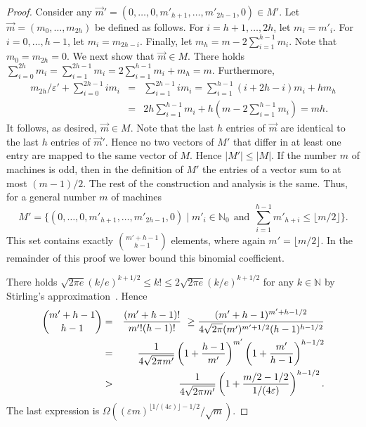 \documentclass{llncs}
\newcommand{\eps}{\varepsilon}
\begin{document}
\begin{proof}
Consider any $\vec{m}' = (0,\ldots, 0,m'_{h+1}, \ldots, m'_{2h-1},0) \in M'$. Let $\vec{m} = (m_0, \ldots, m_{2h})$
be defined as follows. For $i= h+1, \ldots, 2h$, let $m_i = m'_i$. For $i=0, \ldots, h-1$, let $m_i = m_{2h-i}$.
Finally, let $m_h = m -2\sum_{i=1}^{h-1} m_i$. Note that $m_0=m_{2h} =0$. We next show that $\vec{m}\in M$. 
There holds $\sum_{i=0}^{2h} m_i = \sum_{i=1}^{2h-1} m_i = 2\sum_{i=1}^{h-1} m_i +m_h = m$. Furthermore,
\begin{eqnarray*}
m_{2h}/\eps' + \sum_{i=0}^{2h-1} im_i & = & \sum_{i=1}^{2h-1} im_i = \sum_{i=1}^{h-1} (i+2h-i) m_i +hm_h \\
& = & 2h\sum_{i=1}^{h-1}m_i + h(m-2\sum_{i=1}^{h-1} m_i) = mh.
\end{eqnarray*}
It follows, as desired, $\vec{m}\in M$. Note that the last $h$ entries of $\vec{m}$ are identical to the last $h$ entries 
of $\vec{m}'$. Hence no two vectors of $M'$ that differ in at least one entry are mapped to the same vector of
$M$. Hence $|M'| \leq |M|$. If the number $m$ of machines is odd, then in the definition of $M'$ the entries of a vector 
sum to at most $(m-1)/2$. The rest of the construction and analysis is the same. Thus, for a general number $m$ of machines
$$\textstyle{M' = \{(0,\ldots, 0,m'_{h+1}, \ldots, m'_{2h-1},0) \mid  m'_i\in \mathbb{N}_0 \ \ \mbox{and} \ \
\sum_{i=1}^{h-1} m'_{h+i} \leq \lfloor m/2\rfloor\}.}$$
This set contains exactly ${m'+h-1 \choose h-1}$ elements, where again $m' = \lfloor m/2\rfloor$. In the remainder
of this proof we lower bound this binomial coefficient. 

There holds
$\sqrt{2\pi e} (k/e)^{k+1/2} \leq  k! \leq 2 \sqrt{2\pi e} (k/e)^{k+1/2}$
 for any $k\in \mathbb{N}$ by Stir\-ling's approximation~\cite{F}. Hence
\begin{eqnarray*}
{m'+h-1\choose h-1} &=& {(m'+h-1)!\over m'!(h-1)!} \  \geq {(m'+h-1)^{m'+h-1/2}\over 4\sqrt{2\pi} (m')^{m'+1/2} (h-1)^{h-1/2}}\\
&=& {1\over 4\sqrt{2\pi m'}} \left(1+{h-1\over m'}\right)^{m'} \left(1+{m'\over h-1}\right)^{h-1/2} \\
& > & {1\over 4\sqrt{2\pi m'}} \left(1+{m/2-1/2 \over 1/(4\eps)}\right)^{h-1/2}.
\end{eqnarray*}
The last expression is $\Omega((\eps m)^{\lfloor 1/(4\eps)\rfloor -1/2}/\sqrt{m})$.\hspace*{\fill}{$\Box$}
\end{proof}
\end{document}

